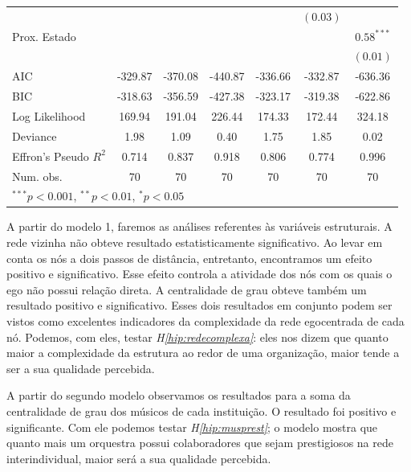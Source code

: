 \documentclass[a4paper, 12pt, openright, oneside, german, french, english, brazil]{abntex2}
\begin{document}
\begin{table}[!ht]
{\begin{tabular}{l c c c c c c }
			&               &               &               &               & $(0.03)$      &               \\
			Prox. Estado      &               &               &               &               &               & $0.58^{***}$  \\
			&               &               &               &               &               & $(0.01)$      \\
			\hline
			AIC                        & -329.87       & -370.08       & -440.87       & -336.66       & -332.87       & -636.36       \\
			BIC                        & -318.63       & -356.59       & -427.38       & -323.17       & -319.38       & -622.86       \\
			Log Likelihood             & 169.94        & 191.04        & 226.44        & 174.33        & 172.44        & 324.18        \\
                   Deviance                   & 1.98          & 1.09          & 0.40          & 1.75          & 1.85          & 0.02          \\
                   Effron's Pseudo $R^2$ & 0.714 & 0.837 & 0.918 & 0.806 & 0.774 & 0.996 \\
			Num. obs.                  & 70            & 70            & 70            & 70            & 70            & 70            \\
			\hline
			\multicolumn{7}{l}{\scriptsize{$^{***}p<0.001$, $^{**}p<0.01$, $^*p<0.05$}}
		\end{tabular}
	}
	{	 }
	\end{table}

	
	A partir do modelo 1, faremos as análises referentes às variáveis estruturais. A rede vizinha não obteve resultado estatisticamente significativo. Ao levar em conta os nós a dois passos de distância, entretanto, encontramos um efeito positivo e significativo. Esse efeito controla a atividade dos nós com os quais o ego não possui relação direta. A centralidade de grau obteve também um resultado positivo e significativo. Esses dois resultados em conjunto podem ser vistos como excelentes indicadores da complexidade da rede egocentrada de cada nó. Podemos, com eles, testar \textit{H\ref{hip:redecomplexa}}: eles nos dizem que quanto maior a complexidade da estrutura ao redor de uma organização, maior tende a ser a sua qualidade percebida.
	
	A partir do segundo modelo observamos os resultados para a soma da centralidade de grau dos músicos de cada instituição. O resultado foi positivo e significante. Com ele podemos testar \textit{H\ref{hip:musprest}}; o modelo mostra que quanto mais um orquestra possui colaboradores que sejam prestigiosos na rede interindividual, maior será a sua qualidade percebida. 
	
\end{document}
